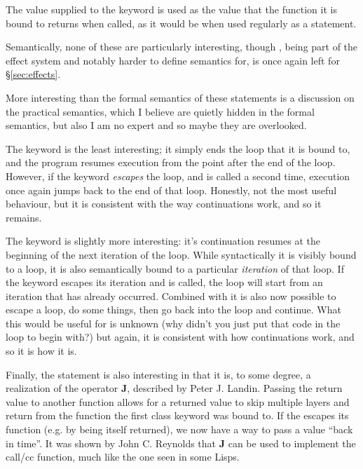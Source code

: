 The value supplied to the  keyword is used as the value that the function
it is bound to returns when called, as it would be when used regularly as a statement.

Semantically, none of these are particularly interesting, though , being
part of the effect system and notably harder to define semantics for, is once again
left for \S\ref{sec:effects}.

\begin{prooftree}
\end{prooftree}

\begin{prooftree}
\end{prooftree}

\begin{prooftree}
\end{prooftree}

More interesting than the formal semantics of these statements is a discussion on
the practical semantics, which I believe are quietly hidden in the formal semantics,
but also I am no expert and so maybe they are overlooked.

The  keyword is the least interesting; it simply ends the loop that it
is bound to, and the program resumes execution from the point after the end of the
loop. However, if the  keyword \emph{escapes} the loop, and is called
a second time, execution once again jumps back to the end of that loop. Honestly, not
the most useful behaviour, but it is consistent with the way continuations work, and
so it remains.

The  keyword is slightly more interesting: it's continuation resumes
at the beginning of the next iteration of the loop. While syntactically it is visibly
bound to a loop, it is also semantically bound to a particular \emph{iteration} of
that loop. If the  keyword escapes its iteration and is called,
the loop will start from an iteration that has already occurred. Combined with
 it is also now possible to escape a loop, do some things, then go back
into the loop and continue. What this would be useful for is unknown (why didn't
you just put that code in the loop to begin with?) but again, it is consistent with
how continuations work, and so it is how it is.

Finally, the  statement is also interesting in that it is, to some degree,
a realization of the operator \textbf{J}, described by Peter J. Landin\cite{j}.
Passing the return value to another function allows for a returned value to skip
multiple layers and return from the function the first class keyword was bound to.
If the  escapes its function (e.g. by being itself returned), we now have
a way to pass a value ``back in time''. It was shown by John C. Reynolds that \textbf{J}
can be used to implement the call/cc function, much like the one seen in some Lisps\cite{defint}.
